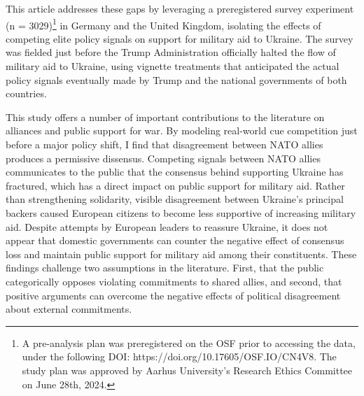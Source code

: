 
This article addresses these gaps by leveraging a preregistered survey experiment (n = 3029)\footnote{A pre-analysis plan was preregistered on the OSF prior to accessing the data, under the following DOI: https://doi.org/10.17605/OSF.IO/CN4V8. The study plan was approved by Aarhus University’s Research Ethics Committee on June 28th, 2024.} in Germany and the United Kingdom, isolating the effects of competing elite policy signals on support for military aid to Ukraine. The survey was fielded just before the Trump Administration officially halted the flow of military aid to Ukraine, using vignette treatments that anticipated the actual policy signals eventually made by Trump and the national governments of both countries. 

This study offers a number of important contributions to the literature on alliances and public support for war. By modeling real-world cue competition just before a major policy shift, I find that disagreement between NATO allies produces a permissive dissensus. Competing signals between NATO allies communicates to the public that the consensus behind supporting Ukraine has fractured, which has a direct impact on public support for military aid. Rather than strengthening solidarity, visible disagreement between Ukraine's principal backers caused European citizens to become less supportive of increasing military aid. Despite attempts by European leaders to reassure Ukraine, it does not appear that domestic governments can counter the negative effect of consensus loss and maintain public support for military aid among their constituents. These findings challenge two assumptions in the literature. First, that the public categorically opposes violating commitments to shared allies,\autocite{chiba_careful_2015, tomz&weeks2021, levin_art_2022} and second, that positive arguments can overcome the negative effects of political disagreement about external commitments.\autocite{chu_commanding_2021, reiter_manipulating_2024} 

